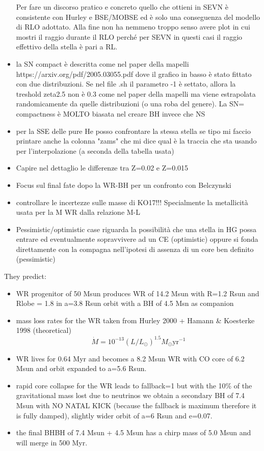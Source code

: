 \documentclass[a4paper,titlepage]{book}     	%
\newcommand{\sun}{\ensuremath{_\odot}}
\newcommand{\msun}{\ensuremath{M\sun}}
\newcommand{\yr}{\text{yr}}
\begin{document}
\begin{itemize}
	Per fare un discorso pratico e concreto quello che ottieni in SEVN è consistente con Hurley e BSE/MOBSE ed è solo una conseguenza del modello di RLO adottato. 
	Alla fine non ha nemmeno troppo senso avere plot in cui mostri il raggio durante il RLO perché per SEVN in questi casi il raggio effettivo della stella è pari a RL. 
	\item la SN compact è descritta come nel paper della mapelli https://arxiv.org/pdf/2005.03055.pdf dove il grafico in basso è stato fittato con due distribuzioni. Se nel file .sh il parametro -1 è settato, allora la treshold zeta2.5 non è 0.3 come nel paper della mapelli ma viene estrapolata randomicamente da quelle distribuzioni (o una roba del genere). La SN= compactness è MOLTO biasata nel creare BH invece che NS
	\item per la SSE delle pure He posso confrontare la stessa stella se tipo mi faccio printare anche la colonna "zams" che mi dice qual è la traccia che sta usando per l'interpolazione (a seconda della tabella usata)
	\item Capire nel dettaglio le differenze tra Z=0.02 e Z=0.015
	\item Focus sul final fate dopo la WR-BH per un confronto con Belczynski
	\item controllare le incertezze sulle masse di KO17!!! Specialmente la metallicità usata per la M WR dalla relazione M-L
	\item Pessimistic/optimistic case riguarda la possibilità che una stella in HG possa entrare ed eventualmente sopravvivere ad un CE (optimistic) oppure si fonda direttamente con la compagna nell'ipotesi di assenza di un core ben definito (pessimistic)
\end{itemize}

They predict:\\
\begin{itemize}
	\item WR progenitor of 50 Msun produces WR of 14.2 Msun with R=1.2 Rsun and Rlobe = 1.8 in a=3.8 Rsun orbit with a BH of 4.5 Msn as companion
	\item mass loss rates for the WR taken from Hurley 2000 + Hamann \& Koesterke 1998 (theoretical)
	\[\dot{M} = 10^{-13}(L/L_\odot)^{1.5} \msun \yr^{-1}\]
	\item WR lives for 0.64 Myr and becomes a 8.2 Msun WR with CO core of 6.2 Msun and orbit expanded to a=5.6 Rsun. 
	\item rapid core collapse for the WR leads to fallback=1 but with the 10\% of the gravitational mass lost due to neutrinos we obtain a secondary BH of 7.4 Msun with NO NATAL KICK (because the fallback is maximum therefore it is fully damped), slightly wider orbit of a=6 Rsun and e=0.07.
	\item the final BHBH of 7.4 Msun + 4.5 Msun has a chirp mass of 5.0 Msun and will merge in 500 Myr.
\end{itemize}
\end{document}
